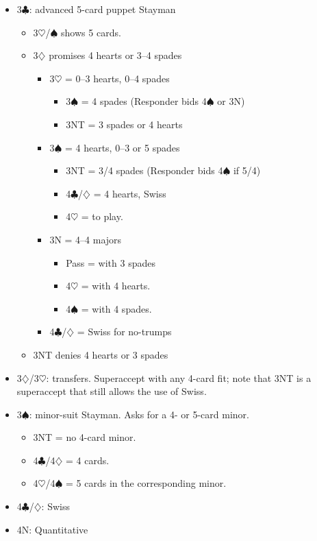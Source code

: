 \documentclass[a4paper,14pt]{extarticle}
\begin{document}
\begin{itemize}
\item 3$\clubsuit$: advanced 5-card puppet Stayman
	\begin{itemize}
   \item 3$\heartsuit$/$\spadesuit$ shows 5 cards.
   \item 3$\diamondsuit$ promises 4 hearts or 3--4 spades
		\begin{itemize}
      \item 3$\heartsuit$ = 0--3 hearts, 0--4 spades
			\begin{itemize}
         \item 3$\spadesuit$ = 4 spades (Responder bids 4$\spadesuit$ or 3N)
         \item 3NT = 3 spades or 4 hearts
			\end{itemize}
      \item 3$\spadesuit$ = 4 hearts, 0--3 or 5 spades
			\begin{itemize}
         \item 3NT = 3/4 spades (Responder bids 4$\spadesuit$ if 5/4)
         \item 4$\clubsuit$/$\diamondsuit$ = 4 hearts, Swiss 
         \item 4$\heartsuit$ = to play.
			\end{itemize}
      \item 3N = 4--4 majors
			\begin{itemize}
			\item Pass = with 3 spades
         \item 4$\heartsuit$ = with 4 hearts.
         \item 4$\spadesuit$ = with 4 spades.
			\end{itemize}
		\item 4$\clubsuit$/$\diamondsuit$ = Swiss  for no-trumps
		\end{itemize}
   \item 3NT denies 4 hearts or 3 spades
	\end{itemize}

\item 3$\diamondsuit$/3$\heartsuit$: transfers.  Superaccept with any 4-card fit; note that 3NT is a
superaccept that still allows the use of Swiss.

\item 3$\spadesuit$: minor-suit Stayman.  Asks for a 4- or 5-card minor.
	\begin{itemize}
   \item 3NT = no 4-card minor.
   \item 4$\clubsuit$/4$\diamondsuit$ = 4 cards.
   \item 4$\heartsuit$/4$\spadesuit$ = 5 cards in the corresponding minor.
	\end{itemize}

\item 4$\clubsuit$/$\diamondsuit$: Swiss 
\item 4N: Quantitative
\end{itemize}
\end{document}
